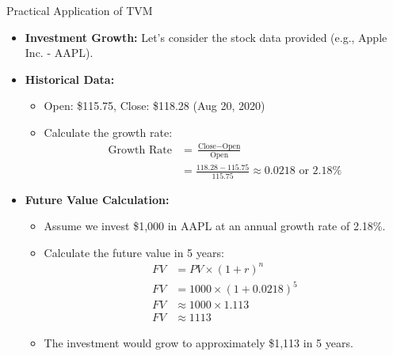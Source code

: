 \documentclass{beamer}
\begin{document}
\begin{frame}{Practical Application of TVM}
    \begin{itemize}
        \item \textbf{Investment Growth:} Let's consider the stock data provided (e.g., Apple Inc. - AAPL).
        \item \textbf{Historical Data:}
        \begin{itemize}
            \item Open: \$115.75, Close: \$118.28 (Aug 20, 2020)
            \item Calculate the growth rate: 
            \begin{align*}
                \text{Growth Rate} &= \frac{\text{Close} - \text{Open}}{\text{Open}} \\
                &= \frac{118.28 - 115.75}{115.75} \approx 0.0218 \text{ or } 2.18\%
            \end{align*}
        \end{itemize}
        \item \textbf{Future Value Calculation:}
        \begin{itemize}
            \item Assume we invest \$1,000 in AAPL at an annual growth rate of 2.18\%.
            \item Calculate the future value in 5 years:
            \begin{align*}
                FV &= PV \times (1 + r)^n \\
                FV &= 1000 \times (1 + 0.0218)^5 \\
                FV &\approx 1000 \times 1.113 \\
                FV &\approx 1113
            \end{align*}
            \item The investment would grow to approximately \$1,113 in 5 years.
        \end{itemize}
    \end{itemize}
\end{frame}
\end{document}
